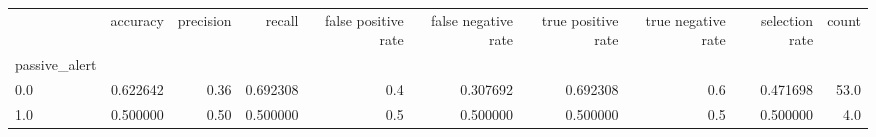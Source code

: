 \begin{tabular}{lrrrrrrrrr}
\toprule
{} &  accuracy &  precision &    recall &  false positive rate &  false negative rate &  true positive rate &  true negative rate &  selection rate &  count \\
passive\_alert &           &            &           &                      &                      &                     &                     &                 &        \\
\midrule
0.0           &  0.622642 &       0.36 &  0.692308 &                  0.4 &             0.307692 &            0.692308 &                 0.6 &        0.471698 &   53.0 \\
1.0           &  0.500000 &       0.50 &  0.500000 &                  0.5 &             0.500000 &            0.500000 &                 0.5 &        0.500000 &    4.0 \\
\bottomrule
\end{tabular}
